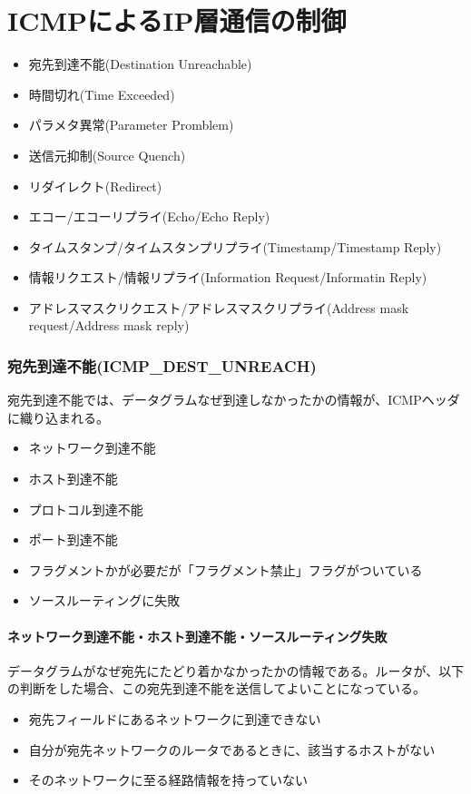 \chapter{ICMPによるIP層通信の制御}

\begin{itemize}
\item 宛先到達不能(Destination Unreachable)
\item 時間切れ(Time Exceeded)
\item  パラメタ異常(Parameter Promblem)
\item 送信元抑制(Source Quench)
\item  リダイレクト(Redirect)
\item エコー/エコーリプライ(Echo/Echo Reply)
\item タイムスタンプ/タイムスタンプリプライ(Timestamp/Timestamp Reply)
\item 情報リクエスト/情報リプライ(Information Request/Informatin Reply)
\item アドレスマスクリクエスト/アドレスマスクリプライ(Address mask request/Address mask reply)
\end{itemize}
\subsection{宛先到達不能(ICMP\_DEST\_UNREACH)}

宛先到達不能では、データグラムなぜ到達しなかったかの情報が、ICMPヘッダに織り込まれる。

\begin{itemize}
\item ネットワーク到達不能
\item ホスト到達不能
\item プロトコル到達不能
\item ポート到達不能
\item フラグメントかが必要だが「フラグメント禁止」フラグがついている
\item ソースルーティングに失敗
\end{itemize}

\subsubsection{ネットワーク到達不能・ホスト到達不能・ソースルーティング失敗}

データグラムがなぜ宛先にたどり着かなかったかの情報である。ルータが、以下の判断をした場合、この宛先到達不能を送信してよいことになっている。

\begin{itemize}
\item 宛先フィールドにあるネットワークに到達できない
\item 自分が宛先ネットワークのルータであるときに、該当するホストがない
\item そのネットワークに至る経路情報を持っていない
\end{itemize}

